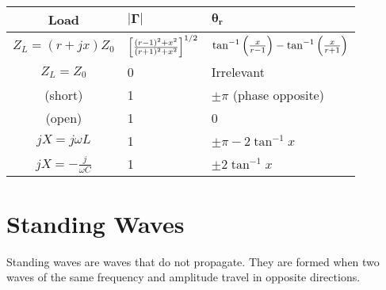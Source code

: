 \documentclass{report}
\begin{document}
{
\renewcommand{\arraystretch}{2.5}
\everymath{\displaystyle}
\begin{table}[H]
	\centering
	\begin{tabularx}{0.8\linewidth}{|c|YY|}
		\hline
		\textbf{Load}              & $\bm{|\Gamma|}$                                       & $\bm{\theta_r}$                                                          \\
		\hline
		$Z_L = (r + jx)Z_0$        & $\left[ \frac{(r-1)^2 + x^2}{(r+1)^2 + x^2} \right]^{1/2}$ & $\tan^{-1} \left( \frac{x}{r-1} \right) - \tan^{-1} \left( \frac{x}{r+1} \right) $ \\
		$Z_L = Z_0$                & 0                                                     & Irrelevant                                                               \\
		(short)                    & 1                                                     & $\pm\pi$ (phase opposite)                                                \\
		(open)                     & 1                                                     & 0                                                                        \\
		$jX = j\omega L$           & 1                                                     & $\pm\pi - 2\tan^{-1}x$                                                   \\
		$jX = -\frac{j}{\omega C}$ & 1                                                     & $\pm 2\tan^{-1}x$                                                        \\
		\hline
	\end{tabularx}
\end{table}
}

\section{Standing Waves}

Standing waves are waves that do not propagate. They are formed when two waves of the same frequency and amplitude travel in opposite directions.
\end{document}
